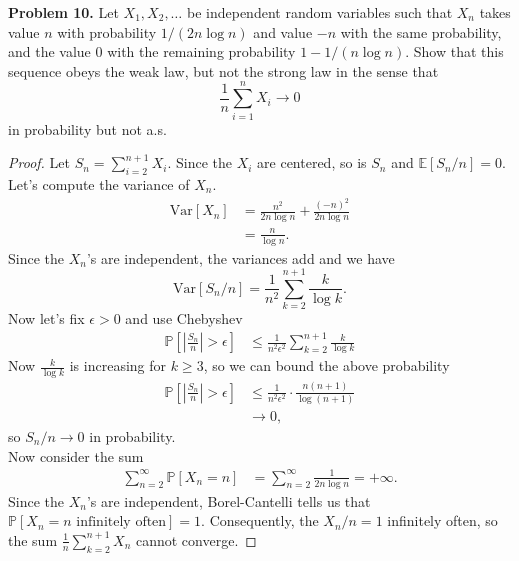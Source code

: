 \documentclass[11pt,letterpaper]{report}
\newcommand{\E}{\mathbb{E}}
\newcommand{\Prob}{\mathbb{P}}
\newcommand{\Var}{\text{Var}}
\begin{document}
\noindent\textbf{Problem 10. }
Let $X_1, X_2, \ldots$ be independent random variables such that $X_n$ takes value $n$ with probability $1/(2n\log n)$ and value $-n$ with the same probability, and the value 0 with the remaining probability $1- 1/(n\log n)$. Show that this sequence obeys the weak law, but not the strong law in the sense that
\[
\frac{1}{n}\sum_{i=1}^nX_i\to 0
\]
in probability but not a.s.
\begin{proof}
	Let $S_n = \sum_{i=2}^{n+1} X_i$. Since the $X_i$ are centered, so is $S_n$ and $\E[S_n/n] = 0$. Let's compute the variance of $X_n$.
	\begin{align*}
		\Var[X_n] &= \frac{n^2}{2n\log n} + \frac{(-n)^2}{2n\log n}\\
		&= \frac{n}{\log n}.
	\end{align*}
	Since the $X_n$'s are independent, the variances add and we have
	\[
	\Var[S_n/n] = \frac{1}{n^2}\sum_{k=2}^{n+1}\frac{k}{\log k}.
	\]
	Now let's fix $\epsilon>0$ and use Chebyshev
	\begin{equation}
	\begin{split}
		\Prob\left[\left|\frac{S_n}{n}\right|>\epsilon\right] &\leq \frac{1}{n^2\epsilon^2}\sum_{k=2}^{n+1}\frac{k}{\log k}
	\end{split}
	\end{equation}
	Now $\frac{k}{\log k}$ is increasing for $k\geq 3$, so we can bound the above probability
	\begin{align*}
		\Prob\left[\left|\frac{S_n}{n}\right|>\epsilon\right] &\leq \frac{1}{n^2\epsilon^2}\cdot \frac{n(n+1)}{\log(n+1)}\\
		&\to 0,
	\end{align*}
	so $S_n/n \to 0$ in probability.\\

	\noindent Now consider the sum
	\begin{align*}
		\sum_{n=2}^\infty \Prob[X_n = n] &= \sum_{n=2}^\infty \frac{1}{2n\log n} = +\infty.
	\end{align*}
	Since the $X_n$'s are independent, Borel-Cantelli tells us that $\Prob[X_n = n\text{ infinitely often}] = 1$. Consequently, the $X_n/n = 1$ infinitely often, so the sum $\frac{1}{n}\sum_{k=2}^{n+1}X_n$ cannot converge.
\end{proof}
\end{document}
